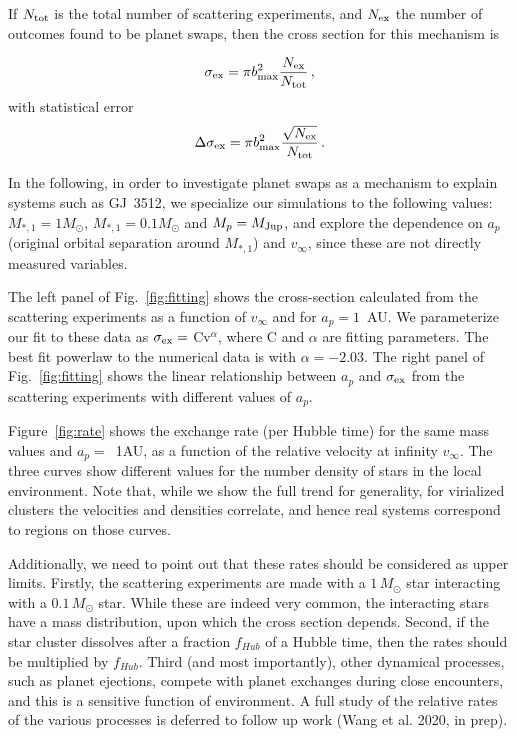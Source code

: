 \documentclass[twocolumn]{aastex62}
\begin{document}
If $N_{\rm tot}$ is the total number of scattering experiments, and $N_{\rm ex}$ the number of outcomes found to be planet swaps, then the cross section for this mechanism is \citep[e.g.][]{hut83}

\begin{equation}
\sigma_{\rm ex} = \pi b_{\rm max}^2\frac{N_{\rm ex}}{N_{\rm tot}}\,,
\end{equation}
with statistical error
\begin{equation}
\Delta\sigma_{\rm ex} = \pi b_{\rm max}^2\frac{\sqrt{N_{\rm ex}}}{N_{\rm tot}}\,.
\end{equation}


In the following, in order to investigate planet swaps as a mechanism to explain systems 
such as GJ~3512, we specialize 
our simulations to the following values:  $M_{*,1}=1M_\odot$, $M_{*,1}=0.1M_\odot$ and $M_p=M_{\rm Jup}$, and explore the dependence on $a_p$ (original orbital separation around $M_{*,1}$) and $v_\infty$, since these are not directly measured variables.

The left panel of Fig.~\ref{fig:fitting} shows the cross-section calculated from the scattering experiments as a function of $v_\infty$ and for $a_p=1$~AU.  We parameterize our fit to these data as $\sigma_{\rm ex} =$ Cv$^{\alpha}$, where C and $\alpha$ are fitting parameters.  The best fit powerlaw to the numerical data is with $\alpha=-2.03$. The right panel of Fig.~\ref{fig:fitting} shows the linear relationship between $a_p$ and $\sigma_{\rm ex}$ from the scattering experiments with different values of $a_p$. 


Figure~\ref{fig:rate} shows the
exchange rate (per Hubble time) for the same mass values and $a_p=$~1AU, as a function of the 
relative velocity at infinity $v_\infty$. The three curves show different values for the number density of stars in the local environment. Note that, while we show the full trend for generality, for virialized clusters the velocities and densities correlate, and hence real systems correspond to regions on those curves. 

Additionally, we need to point out that these rates 
should be considered as upper limits. Firstly, the scattering experiments are made with a $1\,M_\odot$ star interacting with a $0.1\,M_\odot$ star.
While these are indeed very common, the interacting stars have a mass distribution, upon which the cross section depends.
Second, if the star cluster dissolves after a fraction $f_{Hub}$ of a Hubble time, then the rates should be multiplied by $f_{Hub}$. Third (and most importantly), 
other dynamical processes, such as planet ejections, compete with planet exchanges during close encounters, and this is a sensitive function of environment.  
A full study of the relative rates of the various processes is deferred to follow up work (Wang et al. 2020, in prep).
\end{document}

